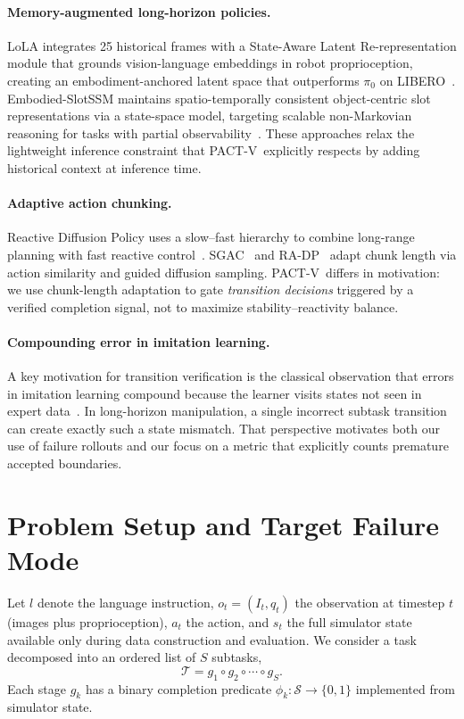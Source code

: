 \documentclass[10pt]{article}
\newcommand{\method}{\textsc{PACT-V}\xspace}
\newcommand{\Sstages}{S}
\begin{document}
\paragraph{Memory-augmented long-horizon policies.}
LoLA integrates 25 historical frames with a State-Aware Latent Re-representation
module that grounds vision-language embeddings in robot proprioception, creating
an embodiment-anchored latent space that outperforms $\pi_0$ on
LIBERO~\cite{lola}.
Embodied-SlotSSM maintains spatio-temporally consistent object-centric slot
representations via a state-space model, targeting scalable non-Markovian
reasoning for tasks with partial observability~\cite{slotssm}.
These approaches relax the lightweight inference constraint that \method\
explicitly respects by adding historical context at inference time.

\paragraph{Adaptive action chunking.}
Reactive Diffusion Policy uses a slow--fast hierarchy to combine long-range
planning with fast reactive control~\cite{reactivedp}.
SGAC~\cite{sgac} and RA-DP~\cite{radp} adapt chunk length via action similarity
and guided diffusion sampling.
\method\ differs in motivation: we use chunk-length adaptation to gate
\emph{transition decisions} triggered by a verified completion signal,
not to maximize stability--reactivity balance.

\paragraph{Compounding error in imitation learning.}
A key motivation for transition verification is the classical observation that
errors in imitation learning compound because the learner visits states not seen
in expert data~\cite{ross2011dagger}.
In long-horizon manipulation, a single incorrect subtask transition can create
exactly such a state mismatch.
That perspective motivates both our use of failure rollouts and our focus on a
metric that explicitly counts premature accepted boundaries.

\section{Problem Setup and Target Failure Mode}
\label{sec:problem}

Let $l$ denote the language instruction, $o_t=(I_t,q_t)$ the observation at
timestep $t$ (images plus proprioception), $a_t$ the action, and $s_t$ the full
simulator state available only during data construction and evaluation.
We consider a task decomposed into an ordered list of $\Sstages$ subtasks,
\[
  \mathcal{T} = g_1 \circ g_2 \circ \cdots \circ g_{\Sstages}.
\]
Each stage $g_k$ has a binary completion predicate
$\phi_k : \mathcal{S} \to \{0,1\}$ implemented from simulator state.
\end{document}
